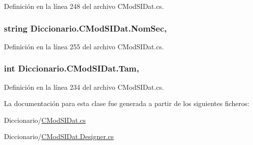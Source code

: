 Definición en la línea 248 del archivo C\-Mod\-S\-I\-Dat.\-cs.

\hypertarget{class_diccionario_1_1_c_mod_s_i_dat_a2d17dfac92ac3a74dc4cf8972cd746ed}{
\subsubsection[{Nom\-Sec}]{\setlength{\rightskip}{0pt plus 5cm}string Diccionario.\-C\-Mod\-S\-I\-Dat.\-Nom\-Sec\hspace{0.3cm}{\ttfamily [get]}, {\ttfamily [set]}}}\label{class_diccionario_1_1_c_mod_s_i_dat_a2d17dfac92ac3a74dc4cf8972cd746ed}


Definición en la línea 255 del archivo C\-Mod\-S\-I\-Dat.\-cs.

\hypertarget{class_diccionario_1_1_c_mod_s_i_dat_aaa53afccd17751427916b0fc00d42497}{
\subsubsection[{Tam}]{\setlength{\rightskip}{0pt plus 5cm}int Diccionario.\-C\-Mod\-S\-I\-Dat.\-Tam\hspace{0.3cm}{\ttfamily [get]}, {\ttfamily [set]}}}\label{class_diccionario_1_1_c_mod_s_i_dat_aaa53afccd17751427916b0fc00d42497}


Definición en la línea 234 del archivo C\-Mod\-S\-I\-Dat.\-cs.



La documentación para esta clase fue generada a partir de los siguientes ficheros\-:\begin{DoxyCompactItemize}
\item 
Diccionario/\hyperlink{_c_mod_s_i_dat_8cs}{C\-Mod\-S\-I\-Dat.\-cs}\item 
Diccionario/\hyperlink{_c_mod_s_i_dat_8_designer_8cs}{C\-Mod\-S\-I\-Dat.\-Designer.\-cs}\end{DoxyCompactItemize}
